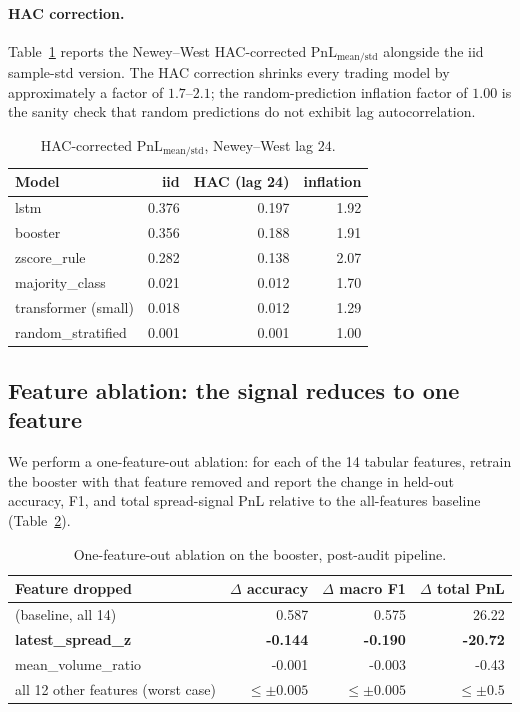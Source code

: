 \documentclass[11pt]{article}
\begin{document}
\paragraph{HAC correction.} Table~\ref{tab:hac} reports the Newey--West
HAC-corrected $\text{PnL}_{\text{mean/std}}$ alongside the iid
sample-std version. The HAC correction shrinks every trading model by
approximately a factor of $1.7$--$2.1$; the random-prediction inflation
factor of $1.00$ is the sanity check that random predictions do not
exhibit lag autocorrelation.

\begin{table}[h]
\centering
\caption{HAC-corrected $\text{PnL}_{\text{mean/std}}$, Newey--West lag $24$.}
\label{tab:hac}
\small
\begin{tabular}{lrrr}
\toprule
Model & iid & HAC (lag 24) & inflation \\
\midrule
lstm                          & 0.376 & 0.197 & 1.92 \\
booster                       & 0.356 & 0.188 & 1.91 \\
zscore\_rule                  & 0.282 & 0.138 & 2.07 \\
majority\_class               & 0.021 & 0.012 & 1.70 \\
transformer (small)           & 0.018 & 0.012 & 1.29 \\
random\_stratified            & 0.001 & 0.001 & 1.00 \\
\bottomrule
\end{tabular}
\end{table}

\subsection{Feature ablation: the signal reduces to one feature}

We perform a one-feature-out ablation: for each of the 14 tabular
features, retrain the booster with that feature removed and report the
change in held-out accuracy, F1, and total spread-signal PnL relative
to the all-features baseline (Table~\ref{tab:ablation}).

\begin{table}[h]
\centering
\caption{One-feature-out ablation on the booster, post-audit pipeline.}
\label{tab:ablation}
\small
\begin{tabular}{lrrr}
\toprule
Feature dropped & $\Delta$ accuracy & $\Delta$ macro F1 & $\Delta$ total PnL \\
\midrule
(baseline, all 14)                                  & 0.587 & 0.575 & 26.22 \\
\textbf{latest\_spread\_z}                          & \textbf{-0.144} & \textbf{-0.190} & \textbf{-20.72} \\
mean\_volume\_ratio                                  & -0.001 & -0.003 & -0.43 \\
all 12 other features (worst case)                  & $\leq \pm 0.005$ & $\leq \pm 0.005$ & $\leq \pm 0.5$ \\
\bottomrule
\end{tabular}
\end{table}
\end{document}
